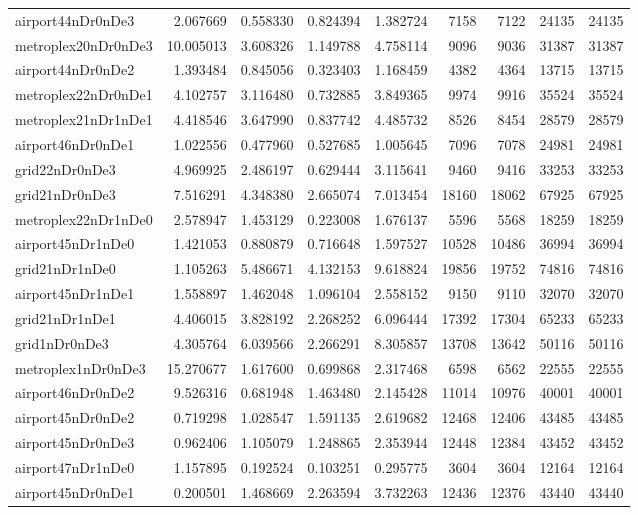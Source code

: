 \begin{longtable}{|l|r|r|r|r|r|r|r|r|}
airport44nDr0nDe3 & 2.067669 & 0.558330 & 0.824394 & 1.382724 & 7158 & 7122 & 24135 & 24135 \\
metroplex20nDr0nDe3 & 10.005013 & 3.608326 & 1.149788 & 4.758114 & 9096 & 9036 & 31387 & 31387 \\
airport44nDr0nDe2 & 1.393484 & 0.845056 & 0.323403 & 1.168459 & 4382 & 4364 & 13715 & 13715 \\
metroplex22nDr0nDe1 & 4.102757 & 3.116480 & 0.732885 & 3.849365 & 9974 & 9916 & 35524 & 35524 \\
metroplex21nDr1nDe1 & 4.418546 & 3.647990 & 0.837742 & 4.485732 & 8526 & 8454 & 28579 & 28579 \\
airport46nDr0nDe1 & 1.022556 & 0.477960 & 0.527685 & 1.005645 & 7096 & 7078 & 24981 & 24981 \\
grid22nDr0nDe3 & 4.969925 & 2.486197 & 0.629444 & 3.115641 & 9460 & 9416 & 33253 & 33253 \\
grid21nDr0nDe3 & 7.516291 & 4.348380 & 2.665074 & 7.013454 & 18160 & 18062 & 67925 & 67925 \\
metroplex22nDr1nDe0 & 2.578947 & 1.453129 & 0.223008 & 1.676137 & 5596 & 5568 & 18259 & 18259 \\
airport45nDr1nDe0 & 1.421053 & 0.880879 & 0.716648 & 1.597527 & 10528 & 10486 & 36994 & 36994 \\
grid21nDr1nDe0 & 1.105263 & 5.486671 & 4.132153 & 9.618824 & 19856 & 19752 & 74816 & 74816 \\
airport45nDr1nDe1 & 1.558897 & 1.462048 & 1.096104 & 2.558152 & 9150 & 9110 & 32070 & 32070 \\
grid21nDr1nDe1 & 4.406015 & 3.828192 & 2.268252 & 6.096444 & 17392 & 17304 & 65233 & 65233 \\
grid1nDr0nDe3 & 4.305764 & 6.039566 & 2.266291 & 8.305857 & 13708 & 13642 & 50116 & 50116 \\
metroplex1nDr0nDe3 & 15.270677 & 1.617600 & 0.699868 & 2.317468 & 6598 & 6562 & 22555 & 22555 \\
airport46nDr0nDe2 & 9.526316 & 0.681948 & 1.463480 & 2.145428 & 11014 & 10976 & 40001 & 40001 \\
airport45nDr0nDe2 & 0.719298 & 1.028547 & 1.591135 & 2.619682 & 12468 & 12406 & 43485 & 43485 \\
airport45nDr0nDe3 & 0.962406 & 1.105079 & 1.248865 & 2.353944 & 12448 & 12384 & 43452 & 43452 \\
airport47nDr1nDe0 & 1.157895 & 0.192524 & 0.103251 & 0.295775 & 3604 & 3604 & 12164 & 12164 \\
airport45nDr0nDe1 & 0.200501 & 1.468669 & 2.263594 & 3.732263 & 12436 & 12376 & 43440 & 43440 \\

\end{longtable}
